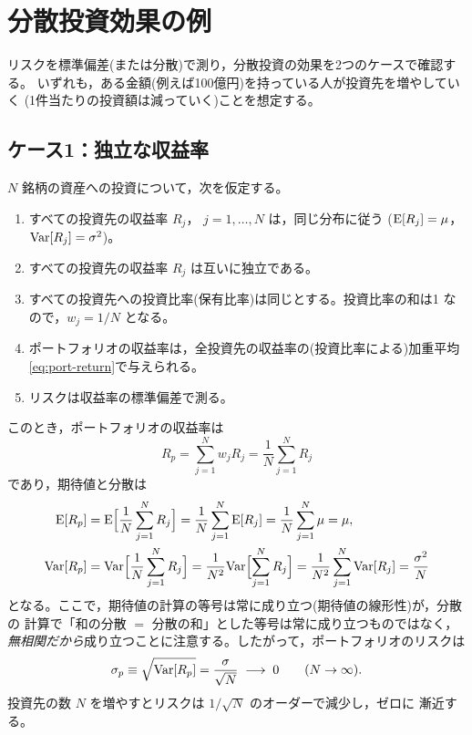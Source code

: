 \section{分散投資効果の例}

リスクを標準偏差(または分散)で測り，分散投資の効果を2つのケースで確認する。
いずれも，ある金額(例えば100億円)を持っている人が投資先を増やしていく
(1件当たりの投資額は減っていく)ことを想定する。

\subsection{ケース1：独立な収益率}

$N$ 銘柄の資産への投資について，次を仮定する。
\begin{enumerate}
\item すべての投資先の収益率 $R_j$， $j=1,\dots,N$ は，同じ分布に従う
($\mathrm{E}[R_j]=\mu$， $\mathrm{Var}[R_j]=\sigma^2$)。
\item すべての投資先の収益率 $R_j$ は互いに独立である。
\item すべての投資先への投資比率(保有比率)は同じとする。投資比率の和は1
なので，$w_j = 1/N$ となる。
\item ポートフォリオの収益率は，全投資先の収益率の(投資比率による)加重平均
\eqref{eq:port-return}で与えられる。
\item リスクは収益率の標準偏差で測る。
\end{enumerate}

このとき，ポートフォリオの収益率は
\[
R_p = \sum_{j=1}^{N} w_j R_j = \frac{1}{N}\sum_{j=1}^{N} R_j
\]
であり，期待値と分散は
\begin{align}
\mathrm{E}[R_p] &= \mathrm{E}\Bigl[\frac{1}{N}\sum_{j=1}^{N}R_j\Bigr]
= \frac{1}{N}\sum_{j=1}^{N}\mathrm{E}[R_j] = \frac{1}{N}\sum_{j=1}^{N}\mu = \mu,\\
\mathrm{Var}[R_p] &= \mathrm{Var}\Bigl[\frac{1}{N}\sum_{j=1}^{N}R_j\Bigr]
= \frac{1}{N^2}\mathrm{Var}\Bigl[\sum_{j=1}^{N}R_j\Bigr]
= \frac{1}{N^2}\sum_{j=1}^{N}\mathrm{Var}[R_j]
= \frac{\sigma^2}{N}
\end{align}
となる。ここで，期待値の計算の等号は常に成り立つ(期待値の線形性)が，分散の
計算で「和の分散 $=$ 分散の和」とした等号は常に成り立つものではなく，
\emph{無相関だから}成り立つことに注意する。したがって，ポートフォリオのリスクは
\begin{equation}
\sigma_p \equiv \sqrt{\mathrm{Var}[R_p]} = \frac{\sigma}{\sqrt{N}}
\;\longrightarrow\; 0 \qquad (N\to\infty).
\end{equation}
投資先の数 $N$ を増やすとリスクは $1/\sqrt{N}$ のオーダーで減少し，ゼロに
漸近する。


